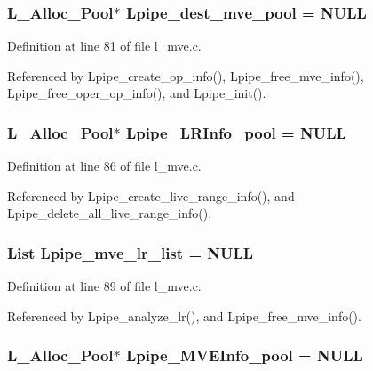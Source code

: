 \subsubsection{\setlength{\rightskip}{0pt plus 5cm}L\_\-Alloc\_\-Pool$\ast$ \bf{Lpipe\_\-dest\_\-mve\_\-pool} = NULL}\label{l__mve_8c_4fd7a438ad2a7b1efa5d57d7aa1933b2}




Definition at line 81 of file l\_\-mve.c.

Referenced by Lpipe\_\-create\_\-op\_\-info(), Lpipe\_\-free\_\-mve\_\-info(), Lpipe\_\-free\_\-oper\_\-op\_\-info(), and Lpipe\_\-init().
\subsubsection{\setlength{\rightskip}{0pt plus 5cm}L\_\-Alloc\_\-Pool$\ast$ \bf{Lpipe\_\-LRInfo\_\-pool} = NULL\hspace{0.3cm}{\tt  [static]}}\label{l__mve_8c_c304f63e31503bac19dfdafffb1acc0e}




Definition at line 86 of file l\_\-mve.c.

Referenced by Lpipe\_\-create\_\-live\_\-range\_\-info(), and Lpipe\_\-delete\_\-all\_\-live\_\-range\_\-info().
\subsubsection{\setlength{\rightskip}{0pt plus 5cm}List \bf{Lpipe\_\-mve\_\-lr\_\-list} = NULL\hspace{0.3cm}{\tt  [static]}}\label{l__mve_8c_b55d273205ba9ea778a0d8d0b79469cb}




Definition at line 89 of file l\_\-mve.c.

Referenced by Lpipe\_\-analyze\_\-lr(), and Lpipe\_\-free\_\-mve\_\-info().
\subsubsection{\setlength{\rightskip}{0pt plus 5cm}L\_\-Alloc\_\-Pool$\ast$ \bf{Lpipe\_\-MVEInfo\_\-pool} = NULL}\label{l__mve_8c_47ef06dbc5fdfb506db61338bd91c45d}




